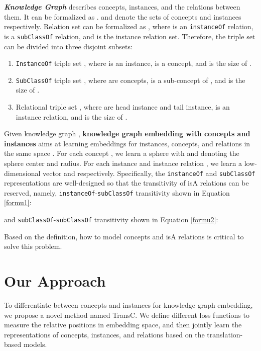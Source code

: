 \documentclass[11pt,a4paper]{article}
\begin{document}
  \textit{\textbf{Knowledge Graph}}  describes concepts, instances, and the relations between them.
  It can be formalized as .  and  denote the 
  sets of concepts and instances respectively. Relation set  can be formalized as ,
  where  is an \texttt{instanceOf} relation,  is a \texttt{subClassOf} relation, and  is the instance relation set.
  Therefore, the triple set  can be divided into three disjoint subsets: 
  
  \begin{enumerate}
    \item \texttt{InstanceOf} triple set , where  is an instance, 
     is a concept, and  is the size of .
    \item \texttt{SubClassOf} triple set , where  
    are concepts,  is a sub-concept of , and  is the size of .
    \item Relational triple set , where  are head instance 
    and tail instance,  is an instance relation, and  is the size of .
  \end{enumerate} 
  
  Given knowledge graph , \textbf{knowledge graph 
  embedding with concepts and instances} aims at learning embeddings for instances, 
  concepts, and relations in the same space . For each concept , 
  we learn a sphere  with  and  denoting the sphere 
  center and radius. For each instance  and instance relation ,
  we learn a low-dimensional vector  and  
  respectively. Specifically, the \texttt{instanceOf} and \texttt{subClassOf} representations 
  are well-designed so that the transitivity of isA relations can be reserved, namely,
  \texttt{instanceOf}-\texttt{subClassOf} transitivity shown in Equation \ref{formu1}:
  
  and \texttt{subClassOf}-\texttt{subClassOf} transitivity shown in Equation \ref{formu2}:
   
  
  Based on the definition, how to model concepts and isA relations is critical to solve this problem.
  
  
  \section{Our Approach}
  
  To differentiate between concepts and instances for knowledge graph embedding, 
  we propose a novel method named TransC.  
  We define different loss functions to measure the relative positions in embedding space, and then
  jointly learn the representations of concepts, instances, and relations based on the 
  translation-based models.
  
\end{document}
